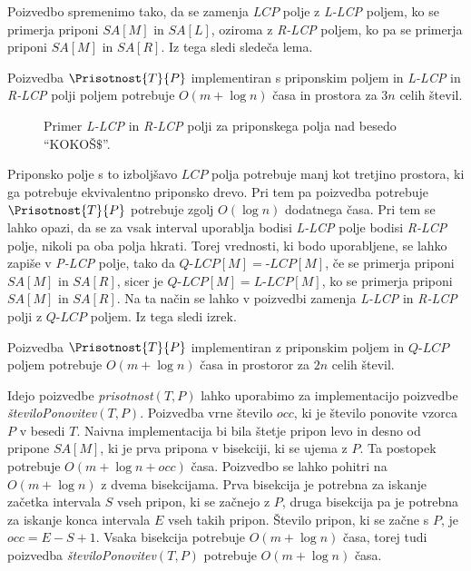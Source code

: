 Poizvedbo spremenimo tako, da se zamenja $LCP$ polje z \textit{L-LCP} poljem, ko se primerja priponi $SA[M]$ in $SA[L]$, oziroma z \textit{R-LCP} poljem, ko pa se primerja priponi $SA[M]$ in $SA[R]$. Iz tega sledi sledeča lema.

\begin{lema}\label{lema:LRLCP}
    Poizvedba $\Prisotnost{T}{P}$ implementiran s priponskim poljem in \textit{L-LCP} in \textit{R-LCP} polji poljem potrebuje $O(m+\log{n})$ časa in prostora za $3n$ celih števil.
\end{lema}

\begin{figure}[htb] 
    
    \centering
    \caption{Primer \textit{L-LCP} in \textit{R-LCP} polji za priponskega polja nad besedo \enquote{KOKOŠ$\$$}.} 
    \label{fig:RlcpLlcpSuffuxArray}
\end{figure}

Priponsko polje s to izboljšavo $LCP$ polja potrebuje manj kot tretjino prostora, ki ga potrebuje ekvivalentno priponsko drevo. Pri tem pa poizvedba potrebuje $\Prisotnost{T}{P}$ potrebuje zgolj $O(\log{n})$ dodatnega časa. Pri tem se lahko opazi, da se za vsak interval uporablja bodisi \textit{L-LCP} polje bodisi \textit{R-LCP} polje, nikoli pa oba polja hkrati. Torej vrednosti, ki bodo uporabljene, se lahko zapiše v \textit{P-LCP} polje, tako da $\textit{Q-LCP}[M]= \textit{-LCP}[M]$, če se primerja priponi $SA[M]$ in $SA[R]$, sicer je $\textit{Q-LCP}[M]= \textit{L-LCP}[M]$, ko se primerja priponi $SA[M]$ in $SA[R]$. Na ta način se lahko v poizvedbi zamenja \textit{L-LCP} in \textit{R-LCP} polji z $\textit{Q-LCP}$ poljem. Iz tega sledi izrek.

\begin{izr}\label{izr:LCP}
    Poizvedba $\Prisotnost{T}{P}$ implementiran z priponskim poljem in $\textit{Q-LCP}$ poljem potrebuje $O(m+\log{n})$ časa in prostoror za $2n$ celih števil.
\end{izr}





Idejo poizvedbe \textit{prisotnost}$(T,P)$ lahko uporabimo za implementacijo poizvedbe \textit{številoPonovitev}$(T,P)$. Poizvedba vrne število $occ$, ki je število ponovite vzorca $P$ v besedi $T$. Naivna implementacija bi bila štetje pripon levo in desno od pripone $SA[M]$, ki je prva pripona v bisekciji, ki se ujema z $P$. Ta postopek potrebuje $O(m + \log{n}+occ)$ časa. Poizvedbo se lahko pohitri na $O(m + \log{n})$ z dvema bisekcijama. Prva bisekcija je potrebna za iskanje začetka intervala $S$ vseh pripon, ki se začnejo z $P$, druga bisekcija pa je potrebna za iskanje konca intervala $E$ vseh takih pripon. Število pripon, ki se začne s $P$, je $occ=E-S+1$. Vsaka bisekcija potrebuje $O(m+\log{n})$ časa, torej tudi poizvedba \textit{številoPonovitev}$(T,P)$ potrebuje $O(m+\log{n})$ časa.

